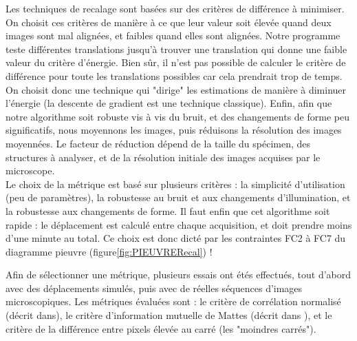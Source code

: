 Les techniques de recalage sont basées sur des critères de différence à minimiser.
On choisit ces critères de manière à ce que leur valeur soit élevée quand deux images sont mal alignées,
et faibles quand elles sont alignées. Notre programme teste différentes translations jusqu'à trouver une translation
qui donne une faible valeur du critère d'énergie.
Bien sûr, il n'est pas possible de calculer le critère de différence pour toute les translations possibles car cela prendrait trop de temps.
On choisit donc une technique qui "dirige" les estimations de manière à diminuer l'énergie
(la descente de gradient est une technique classique).
Enfin, afin que notre algorithme soit robuste vis à vis du bruit, et des changements de forme peu significatifs,
nous moyennons les images, puis réduisons la résolution des images moyennées.
Le facteur de réduction dépend de la taille du spécimen, des structures à analyser,
et de la résolution initiale des images acquises par le microscope.
\\
Le choix de la métrique est basé sur plusieurs critères : la simplicité d'utilisation (peu de paramètres),
la robustesse au bruit et aux changements d'illumination, et la robustesse aux changements de forme. Il faut enfin que cet algorithme soit rapide : le déplacement est calculé entre chaque acquisition, et doit prendre moins d'une minute au total. Ce choix est donc dicté par les contraintes FC2 à FC7 du diagramme pieuvre (figure\ref{fig:PIEUVRERecal}) !

Afin de sélectionner une métrique, plusieurs essais ont étés effectués, tout d'abord avec des déplacements simulés,
puis avec de réelles séquences d'images microscopiques. Les métriques évaluées sont : le critère de corrélation normalisé (décrit dans\cite{registrationCrossCorr}), le critère d'information mutuelle de Mattes (décrit dans \cite{mattes2001nonrigid}), et le critère de la différence entre pixels élevée au carré (les "moindres carrés").

